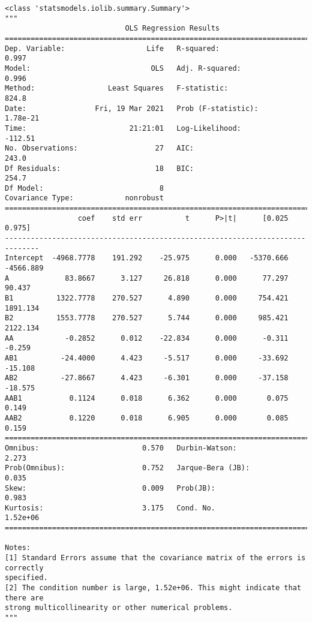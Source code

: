 \documentclass[11pt]{ctexart}
\makeatletter
\newcommand{\boxspacing}{\kern\kvtcb@left@rule\kern\kvtcb@boxsep}
\newcommand{\prompt}[4]{
        {\ttfamily\llap{{\color{#2}[#3]:\hspace{3pt}#4}}\vspace{-\baselineskip}}
    }
\makeatother
\begin{document}
            \begin{tcolorbox}[breakable, size=fbox, boxrule=.5pt, pad at break*=1mm, opacityfill=0]
\prompt{Out}{outcolor}{11}{\boxspacing}
\begin{Verbatim}[commandchars=\\\{\}]
<class 'statsmodels.iolib.summary.Summary'>
"""
                            OLS Regression Results
==============================================================================
Dep. Variable:                   Life   R-squared:                       0.997
Model:                            OLS   Adj. R-squared:                  0.996
Method:                 Least Squares   F-statistic:                     824.8
Date:                Fri, 19 Mar 2021   Prob (F-statistic):           1.78e-21
Time:                        21:21:01   Log-Likelihood:                -112.51
No. Observations:                  27   AIC:                             243.0
Df Residuals:                      18   BIC:                             254.7
Df Model:                           8
Covariance Type:            nonrobust
==============================================================================
                 coef    std err          t      P>|t|      [0.025      0.975]
------------------------------------------------------------------------------
Intercept  -4968.7778    191.292    -25.975      0.000   -5370.666   -4566.889
A             83.8667      3.127     26.818      0.000      77.297      90.437
B1          1322.7778    270.527      4.890      0.000     754.421    1891.134
B2          1553.7778    270.527      5.744      0.000     985.421    2122.134
AA            -0.2852      0.012    -22.834      0.000      -0.311      -0.259
AB1          -24.4000      4.423     -5.517      0.000     -33.692     -15.108
AB2          -27.8667      4.423     -6.301      0.000     -37.158     -18.575
AAB1           0.1124      0.018      6.362      0.000       0.075       0.149
AAB2           0.1220      0.018      6.905      0.000       0.085       0.159
==============================================================================
Omnibus:                        0.570   Durbin-Watson:                   2.273
Prob(Omnibus):                  0.752   Jarque-Bera (JB):                0.035
Skew:                           0.009   Prob(JB):                        0.983
Kurtosis:                       3.175   Cond. No.                     1.52e+06
==============================================================================

Notes:
[1] Standard Errors assume that the covariance matrix of the errors is correctly
specified.
[2] The condition number is large, 1.52e+06. This might indicate that there are
strong multicollinearity or other numerical problems.
"""
\end{Verbatim}
\end{tcolorbox}
        
\end{document}
